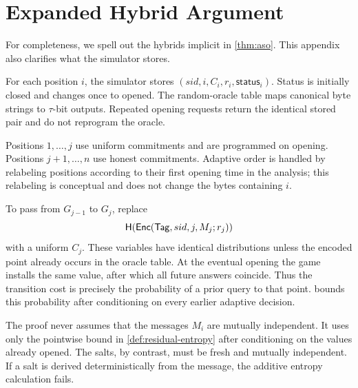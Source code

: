 \section{Expanded Hybrid Argument}
\label{app:hybrids}

For completeness, we spell out the hybrids implicit in
\cref{thm:aso}.  This appendix also clarifies what the simulator stores.

 For each position $i$, the simulator stores
$(sid,i,C_i,r_i,\mathsf{status}_i)$.  Status is initially \textsf{closed} and
changes once to \textsf{opened}.  The random-oracle table maps canonical byte
strings to $\tau$-bit outputs.  Repeated opening requests return the identical
stored pair and do not reprogram the oracle.

 Positions $1,\ldots,j$ use uniform commitments and are
programmed on opening.  Positions $j+1,\ldots,n$ use honest commitments.
Adaptive order is handled by relabeling positions according to their first
opening time in the analysis; this relabeling is conceptual and does not
change the bytes containing $i$.

 To pass from $G_{j-1}$ to $G_j$, replace
\[
 \mathsf{H}(\mathsf{Enc}(\mathsf{Tag},sid,j,M_j;r_j))
\]
with a uniform $C_j$.  These variables have identical distributions unless
the encoded point already occurs in the oracle table.  At the eventual opening
the game installs the same value, after which all future answers coincide.
Thus the transition cost is precisely the probability of a prior query to
that point.   bounds this probability after conditioning on
every earlier adaptive decision.

 The proof never assumes that the
messages $M_i$ are mutually independent.  It uses only the pointwise bound in
\cref{def:residual-entropy} after conditioning on the values already opened.
The salts, by contrast, must be fresh and mutually independent.  If a salt is
derived deterministically from the message, the additive entropy calculation
fails.
